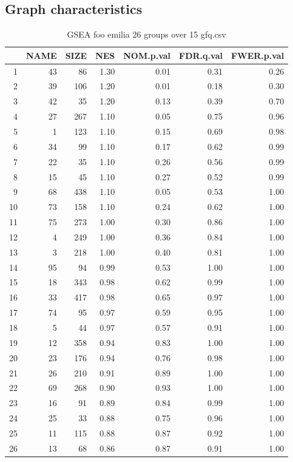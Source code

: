 \subsection{Graph characteristics}

\begin{table}[ht]
\centering
\begin{tabular}{rrrrrrr}
  \hline
 & NAME & SIZE & NES & NOM.p.val & FDR.q.val & FWER.p.val \\ 
  \hline
1 &  43 &  86 & 1.30 & 0.01 & 0.31 & 0.26 \\ 
  2 &  39 & 106 & 1.20 & 0.01 & 0.18 & 0.30 \\ 
  3 &  42 &  35 & 1.20 & 0.13 & 0.39 & 0.70 \\ 
  4 &  27 & 267 & 1.10 & 0.05 & 0.75 & 0.96 \\ 
  5 &   1 & 123 & 1.10 & 0.15 & 0.69 & 0.98 \\ 
  6 &  34 &  99 & 1.10 & 0.17 & 0.62 & 0.99 \\ 
  7 &  22 &  35 & 1.10 & 0.26 & 0.56 & 0.99 \\ 
  8 &  15 &  45 & 1.10 & 0.27 & 0.52 & 0.99 \\ 
  9 &  68 & 438 & 1.10 & 0.05 & 0.53 & 1.00 \\ 
  10 &  73 & 158 & 1.10 & 0.24 & 0.62 & 1.00 \\ 
  11 &  75 & 273 & 1.00 & 0.30 & 0.86 & 1.00 \\ 
  12 &   4 & 249 & 1.00 & 0.36 & 0.84 & 1.00 \\ 
  13 &   3 & 218 & 1.00 & 0.40 & 0.81 & 1.00 \\ 
  14 &  95 &  94 & 0.99 & 0.53 & 1.00 & 1.00 \\ 
  15 &  18 & 343 & 0.98 & 0.62 & 0.99 & 1.00 \\ 
  16 &  33 & 417 & 0.98 & 0.65 & 0.97 & 1.00 \\ 
  17 &  74 &  95 & 0.97 & 0.59 & 0.95 & 1.00 \\ 
  18 &   5 &  44 & 0.97 & 0.57 & 0.91 & 1.00 \\ 
  19 &  12 & 358 & 0.94 & 0.83 & 1.00 & 1.00 \\ 
  20 &  23 & 176 & 0.94 & 0.76 & 0.98 & 1.00 \\ 
  21 &  26 & 210 & 0.91 & 0.89 & 1.00 & 1.00 \\ 
  22 &  69 & 268 & 0.90 & 0.93 & 1.00 & 1.00 \\ 
  23 &  16 &  91 & 0.89 & 0.84 & 0.99 & 1.00 \\ 
  24 &  25 &  33 & 0.88 & 0.75 & 0.96 & 1.00 \\ 
  25 &  11 & 115 & 0.88 & 0.87 & 0.92 & 1.00 \\ 
  26 &  13 &  68 & 0.86 & 0.87 & 0.91 & 1.00 \\ 
   \hline
\end{tabular}
\caption{GSEA foo emilia 26 groups over 15 gfq.csv} 
\label{gfq.csv}
\end{table}

